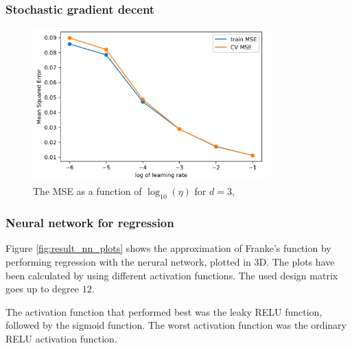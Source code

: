 \documentclass[../main.tex]{subfiles}
\begin{document}
\subsubsection{Stochastic gradient decent}
\begin{figure}[htb]
    \centering
    \includegraphics[width=0.8\textwidth]{../assets/etas_vs_mse.png}
    \caption{The MSE as a function of $\log_10(\eta)$ for $d=3$, }
    \label{fig:etas_vs_mse}
\end{figure}

\subsubsection{Neural network for regression}
Figure \ref{fig:result_nn_plots} shows the approximation of Franke's function by performing regression with the nerural network, plotted in 3D. The plots have been calculated by using different activation functions. The used design matrix goes up to degree $12$.

The activation function that performed best was the leaky RELU function, followed by the sigmoid function. The worst activation function was the ordinary RELU activation function.
\end{document}
